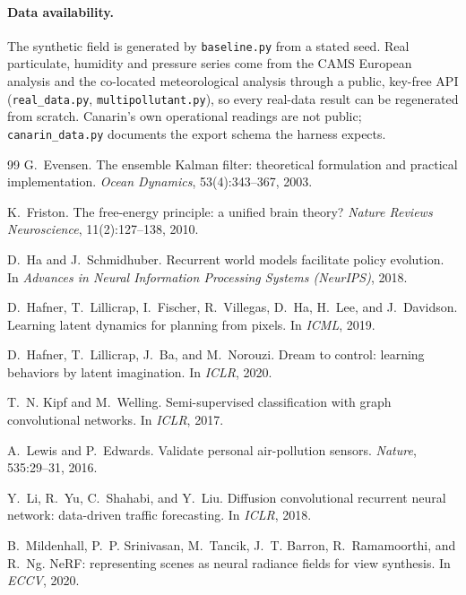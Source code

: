\documentclass[10pt]{article}
\begin{document}
\paragraph{Data availability.}
The synthetic field is generated by \texttt{baseline.py} from a stated seed. Real
particulate, humidity and pressure series come from the CAMS European analysis and
the co-located meteorological analysis through a public, key-free API
(\texttt{real\_data.py}, \texttt{multipollutant.py}), so every real-data result
can be regenerated from scratch. Canarin's own operational readings are not
public; \texttt{canarin\_data.py} documents the export schema the harness expects.

\small
\begin{thebibliography}{99}
G.~Evensen. The ensemble Kalman filter: theoretical formulation and practical
implementation. \emph{Ocean Dynamics}, 53(4):343--367, 2003.

K.~Friston. The free-energy principle: a unified brain theory?
\emph{Nature Reviews Neuroscience}, 11(2):127--138, 2010.

D.~Ha and J.~Schmidhuber. Recurrent world models facilitate policy evolution.
In \emph{Advances in Neural Information Processing Systems (NeurIPS)}, 2018.

D.~Hafner, T.~Lillicrap, I.~Fischer, R.~Villegas, D.~Ha, H.~Lee, and J.~Davidson.
Learning latent dynamics for planning from pixels. In \emph{ICML}, 2019.

D.~Hafner, T.~Lillicrap, J.~Ba, and M.~Norouzi. Dream to control: learning
behaviors by latent imagination. In \emph{ICLR}, 2020.

T.~N. Kipf and M.~Welling. Semi-supervised classification with graph
convolutional networks. In \emph{ICLR}, 2017.

A.~Lewis and P.~Edwards. Validate personal air-pollution sensors.
\emph{Nature}, 535:29--31, 2016.

Y.~Li, R.~Yu, C.~Shahabi, and Y.~Liu. Diffusion convolutional recurrent neural
network: data-driven traffic forecasting. In \emph{ICLR}, 2018.

B.~Mildenhall, P.~P. Srinivasan, M.~Tancik, J.~T. Barron, R.~Ramamoorthi, and
R.~Ng. NeRF: representing scenes as neural radiance fields for view synthesis.
In \emph{ECCV}, 2020.


\end{thebibliography}
\end{document}
